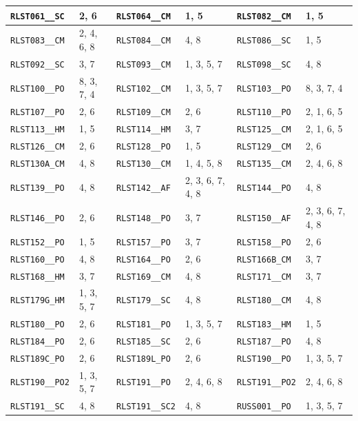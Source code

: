 \begin{longtable}{|l|l||l|l||l|l|}
    \verb|RLST061__SC| & 2, 6 & \verb|RLST064__CM| & 1, 5 & \verb|RLST082__CM| & 1, 5\\\hline
    \verb|RLST083__CM| & 2, 4, 6, 8 & \verb|RLST084__CM| & 4, 8 & \verb|RLST086__SC| & 1, 5\\\hline
    \verb|RLST092__SC| & 3, 7 & \verb|RLST093__CM| & 1, 3, 5, 7 & \verb|RLST098__SC| & 4, 8\\\hline
    \verb|RLST100__PO| & 8, 3, 7, 4 & \verb|RLST102__CM| & 1, 3, 5, 7 & \verb|RLST103__PO| & 8, 3, 7, 4\\\hline
    \verb|RLST107__PO| & 2, 6 & \verb|RLST109__CM| & 2, 6 & \verb|RLST110__PO| & 2, 1, 6, 5\\\hline
    \verb|RLST113__HM| & 1, 5 & \verb|RLST114__HM| & 3, 7 & \verb|RLST125__CM| & 2, 1, 6, 5\\\hline
    \verb|RLST126__CM| & 2, 6 & \verb|RLST128__PO| & 1, 5 & \verb|RLST129__CM| & 2, 6\\\hline
    \verb|RLST130A_CM| & 4, 8 & \verb|RLST130__CM| & 1, 4, 5, 8 & \verb|RLST135__CM| & 2, 4, 6, 8\\\hline
    \verb|RLST139__PO| & 4, 8 & \verb|RLST142__AF| & 2, 3, 6, 7, 4, 8 & \verb|RLST144__PO| & 4, 8\\\hline
    \verb|RLST146__PO| & 2, 6 & \verb|RLST148__PO| & 3, 7 & \verb|RLST150__AF| & 2, 3, 6, 7, 4, 8\\\hline
    \verb|RLST152__PO| & 1, 5 & \verb|RLST157__PO| & 3, 7 & \verb|RLST158__PO| & 2, 6\\\hline
    \verb|RLST160__PO| & 4, 8 & \verb|RLST164__PO| & 2, 6 & \verb|RLST166B_CM| & 3, 7\\\hline
    \verb|RLST168__HM| & 3, 7 & \verb|RLST169__CM| & 4, 8 & \verb|RLST171__CM| & 3, 7\\\hline
    \verb|RLST179G_HM| & 1, 3, 5, 7 & \verb|RLST179__SC| & 4, 8 & \verb|RLST180__CM| & 4, 8\\\hline
    \verb|RLST180__PO| & 2, 6 & \verb|RLST181__PO| & 1, 3, 5, 7 & \verb|RLST183__HM| & 1, 5\\\hline
    \verb|RLST184__PO| & 2, 6 & \verb|RLST185__SC| & 2, 6 & \verb|RLST187__PO| & 4, 8\\\hline
    \verb|RLST189C_PO| & 2, 6 & \verb|RLST189L_PO| & 2, 6 & \verb|RLST190__PO| & 1, 3, 5, 7\\\hline
    \verb|RLST190__PO2| & 1, 3, 5, 7 & \verb|RLST191__PO| & 2, 4, 6, 8 & \verb|RLST191__PO2| & 2, 4, 6, 8\\\hline
    \verb|RLST191__SC| & 4, 8 & \verb|RLST191__SC2| & 4, 8 & \verb|RUSS001__PO| & 1, 3, 5, 7\\\hline

\end{longtable}
